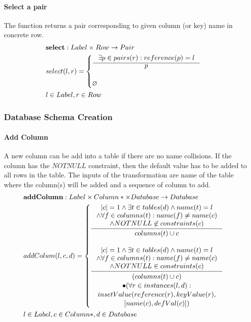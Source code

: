 \documentclass[11pt]{article}
\begin{document}
\paragraph{Select a pair} The function returns a pair corresponding to given column (or key) name in concrete row.
\begin{align*}
& \mathbf{select} : Label \times Row \rightarrow Pair \\
&	select(l, r) = \begin{cases}
		\inference{\exists p \in pairs(r) : reference(p) = l}{p} \\ \\
			\varnothing
		\end{cases}\\
&		l \in Label, r \in Row
\end{align*}
\subsubsection{Database Schema Creation}
\paragraph{Add Column} A new column can be add into a table if there are no name collisions. If the column has the $NOTNULL$ constraint, then the default value has to be added to all rows in the table. The inputs of the transformation are name of the table where the column(s) will be added and a sequence of column to add.
\begin{align*}
&	\mathbf{addColumn} : Label \times Column* \times Database \rightarrow Database \\ 	
&	addColum(l, c, d) = \begin{cases}
		\inference{|c| = 1 \wedge \exists t \in tables(d) \wedge name(t) = l \\ \wedge \forall f \in columns(t) : name(f) \neq name(c) \\ \wedge NOTNULL \not \in constraints(c) }{columns(t) \cup c}\\ \\
		\inference{|c| = 1 \wedge \exists t \in tables(d) \wedge name(t) = l \\ \wedge \forall f \in columns(t) : name(f) \neq name(c) \\ \wedge NOTNULL \in constraints(c)}{\begin{gathered}
	 (columns(t) \cup c) \\ \bullet (\forall r \in instances(l, d): \\ insetValue(reference(r), keyValue(r), \\ [name(c), defVal(c)]) 
	\end{gathered}}
	 \end{cases}\\ 
&	 l \in Label, c \in Column*,d \in Database
\end{align*}
\end{document}
